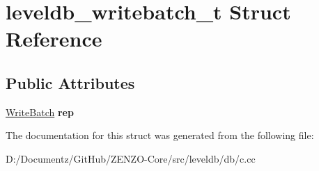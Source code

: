 \hypertarget{structleveldb__writebatch__t}{}\section{leveldb\+\_\+writebatch\+\_\+t Struct Reference}
\label{structleveldb__writebatch__t}
\subsection*{Public Attributes}
\begin{DoxyCompactItemize}
\item 
\mbox{\label{structleveldb__writebatch__t_ac96538c849db578bea786bf29fae6e5f}} 
\mbox{\hyperlink{classleveldb_1_1_write_batch}{Write\+Batch}} {\bfseries rep}
\end{DoxyCompactItemize}


The documentation for this struct was generated from the following file\+:\begin{DoxyCompactItemize}
\item 
D\+:/\+Documentz/\+Git\+Hub/\+Z\+E\+N\+Z\+O-\/\+Core/src/leveldb/db/c.\+cc\end{DoxyCompactItemize}
